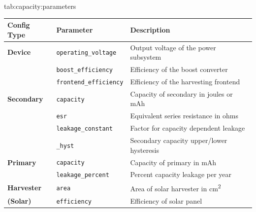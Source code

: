 \begin{definetable}{tab:capacity:parameters}
    \centering
    \begin{tabularx}{\columnwidth}{@{\extracolsep{\fill}} lll}
\hline
\textbf{Config Type}& \multicolumn{1}{l}{\textbf{Parameter}}                   & \multicolumn{1}{l}{\textbf{Description}} \\ \hline
\textbf{Device}     & \texttt{operating\_voltage}                              & Output voltage of the power subsystem    \\
                    & \texttt{boost\_efficiency}                               & Efficiency of the boost converter        \\
                    & \texttt{frontend\_efficiency}                            & Efficiency of the harvesting frontend    \\ \hline
\textbf{Secondary}  & \texttt{capacity}                                        & Capacity of secondary in joules or mAh   \\
                    & \texttt{esr}                                             & Equivalent series resistance in ohms     \\
                    & \texttt{leakage\_constant}                               & Factor for capacity dependent leakage    \\
                    & \texttt{\string{max, min\string}\_hyst}                  & Secondary capacity upper/lower hysteresis\\ \hline
\textbf{Primary}    & \texttt{capacity}                                        & Capacity of primary in mAh               \\
                    & \texttt{leakage\_percent}                                & Percent capacity leakage per year        \\ \hline
        \textbf{Harvester}  & \texttt{area}                                    & Area of solar harvester in cm\textsuperscript{2}\\
\textbf{(Solar)}    & \texttt{efficiency}                                      & Efficiency of solar panel                \\ \hline

\end{tabularx}
\end{definetable}
